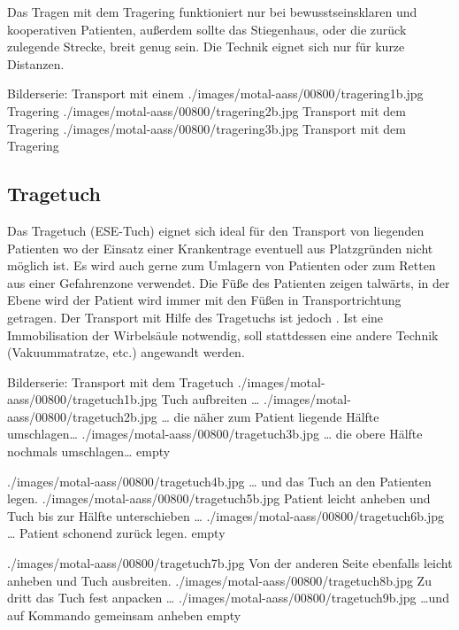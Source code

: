 \label{topic:tragering}

Das Tragen mit dem Tragering funktioniert nur bei bewusstseinsklaren und
kooperativen Patienten, außerdem sollte das Stiegenhaus, oder die zurück
zulegende Strecke, breit genug sein. Die Technik eignet sich nur für kurze
Distanzen.

\begin{PictureSeriesWide}{}{Bilderserie: Transport mit einem
 }
{./images/motal-aass/00800/tragering1b.jpg}
{Tragering}
{./images/motal-aass/00800/tragering2b.jpg}
{Transport mit dem Tragering}
{./images/motal-aass/00800/tragering3b.jpg}
{Transport mit dem Tragering}
{}
{}
\end{PictureSeriesWide}






\subsection{Tragetuch}

\label{topic:bergetuch}
\label{topic:tragetuch-taetigkeit}

Das Tragetuch (ESE-Tuch) eignet sich ideal für den Transport
von liegenden Patienten wo der Einsatz einer Krankentrage
eventuell aus Platzgründen nicht möglich ist. Es wird auch
gerne zum Umlagern von Patienten oder zum Retten aus einer
Gefahrenzone verwendet. Die Füße des Patienten zeigen
talwärts, in der Ebene wird der Patient wird immer mit den
Füßen in Transportrichtung getragen.
Der Transport mit Hilfe des Tragetuchs ist jedoch . Ist eine Immobilisation der
Wirbelsäule notwendig, soll stattdessen eine andere Technik
(Vakuummatratze, etc.) angewandt werden.


\begin{PictureSeriesWide}{}{Bilderserie: Transport mit dem Tragetuch}
{./images/motal-aass/00800/tragetuch1b.jpg}%
{Tuch aufbreiten \ldots}
{./images/motal-aass/00800/tragetuch2b.jpg}%
{{\ldots} die näher zum Patient liegende Hälfte
umschlagen\ldots }
{./images/motal-aass/00800/tragetuch3b.jpg}%
{{\ldots} die obere Hälfte nochmals
umschlagen\ldots }
{empty}%
{}

{./images/motal-aass/00800/tragetuch4b.jpg}%
{{\ldots} und das Tuch an den Patienten legen.}
{./images/motal-aass/00800/tragetuch5b.jpg}%
{Patient leicht anheben und Tuch bis zur Hälfte
unterschieben \ldots}
{./images/motal-aass/00800/tragetuch6b.jpg}%
{{\ldots} Patient schonend zurück legen.}
{empty}%
{}

{./images/motal-aass/00800/tragetuch7b.jpg}%
{Von der anderen Seite ebenfalls leicht anheben und
Tuch ausbreiten. }
{./images/motal-aass/00800/tragetuch8b.jpg}%
{Zu dritt das Tuch fest anpacken \ldots }
{./images/motal-aass/00800/tragetuch9b.jpg}%
{\ldots und auf Kommando gemeinsam anheben}
{empty}%
{}
\end{PictureSeriesWide}



